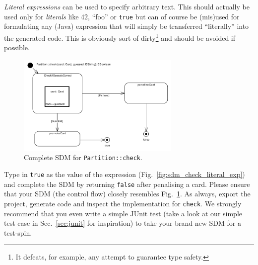 \emph{Literal expressions} can be used
to specify arbitrary text.  This should actually be used only for
\emph{literals} like 42, ``foo'' or \texttt{true} but can of course be (mis)used
for formulating any (Java) expression that will simply be transferred
``literally'' into the  generated code. This is obviously sort of
dirty\footnote{It defeats, for example, any attempt to guarantee type safety.} 
and should be avoided if possible.
  
\begin{figure}[htbp]
\begin{center}
  \includegraphics[width=0.7\textwidth]{pics/sdmBilder/check/sdm40}
  \caption{Complete SDM for \texttt{Partition::check}.}  
  \label{fig:sdm_check_finish}
\end{center}
\end{figure}

Type in \texttt{true} as the value of the expression
(Fig.~\ref{fig:sdm_check_literal_exp}) and complete the SDM by returning
\texttt{false} after penalising a card.  Please ensure that your SDM (the
control flow) closely resembles Fig.~\ref{fig:sdm_check_finish}.  As always,
export the project, generate code and inspect the implementation for
\texttt{check}.  We strongly recommend that you even write a simple JUnit test
(take a look at our simple test case in Sec.~\ref{sec:junit} for inspiration)
to take your brand new SDM for a test-spin.
